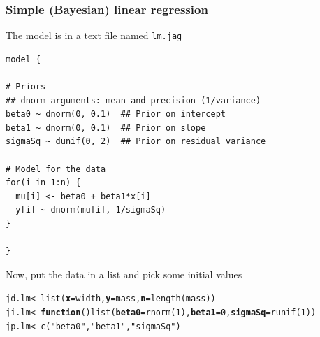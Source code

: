 \documentclass[color=usenames,dvipsnames]{beamer}\usepackage[]{graphicx}\usepackage[]{xcolor}
\makeatletter
\newcommand{\hlnum}[1]{\textcolor[rgb]{0.69,0.494,0}{#1}}%
\newcommand{\hlsng}[1]{\textcolor[rgb]{0.749,0.012,0.012}{#1}}%
\newcommand{\hldef}[1]{\textcolor[rgb]{0,0,0}{#1}}%
\newcommand{\hlkwa}[1]{\textcolor[rgb]{0,0,0}{\textbf{#1}}}%
\newcommand{\hlkwb}[1]{\textcolor[rgb]{0,0.341,0.682}{#1}}%
\newcommand{\hlkwc}[1]{\textcolor[rgb]{0,0,0}{\textbf{#1}}}%
\newcommand{\hlkwd}[1]{\textcolor[rgb]{0.004,0.004,0.506}{#1}}%
\newenvironment{kframe}{%
 \def\at@end@of@kframe{}%
 \ifinner\ifhmode%
  \def\at@end@of@kframe{\end{minipage}}%
  \begin{minipage}{\columnwidth}%
 \fi\fi%
 \def\FrameCommand##1{\hskip\@totalleftmargin \hskip-\fboxsep
 \colorbox{shadecolor}{##1}\hskip-\fboxsep
     \hskip-\linewidth \hskip-\@totalleftmargin \hskip\columnwidth}%
 \MakeFramed {\advance\hsize-\width
   \@totalleftmargin\z@ \linewidth\hsize
   \@setminipage}}%
 {\par\unskip\endMakeFramed%
 \at@end@of@kframe}
\newenvironment{knitrout}{}{} %
\makeatother
\begin{document}
\begin{frame}[fragile]
  \frametitle{Simple (Bayesian) linear regression}
  \small
  The model is in a text file named {\tt lm.jag} \\
\begin{knitrout}\scriptsize
{}\color{fgcolor}\begin{kframe}
\begin{verbatim}
model {

# Priors
## dnorm arguments: mean and precision (1/variance)
beta0 ~ dnorm(0, 0.1)  ## Prior on intercept  
beta1 ~ dnorm(0, 0.1)  ## Prior on slope
sigmaSq ~ dunif(0, 2)  ## Prior on residual variance

# Model for the data
for(i in 1:n) {
  mu[i] <- beta0 + beta1*x[i]
  y[i] ~ dnorm(mu[i], 1/sigmaSq)
}

}
\end{verbatim}
\end{kframe}
\end{knitrout}
\pause
\vfill
Now, put the data in a list and pick some initial values
\begin{knitrout}\footnotesize
{}\color{fgcolor}\begin{kframe}
\begin{alltt}
\hldef{jd.lm} \hlkwb{<-} \hlkwd{list}\hldef{(}\hlkwc{x}\hldef{=width,} \hlkwc{y}\hldef{=mass,} \hlkwc{n}\hldef{=}\hlkwd{length}\hldef{(mass))}
\hldef{ji.lm} \hlkwb{<-} \hlkwa{function}\hldef{()} \hlkwd{list}\hldef{(}\hlkwc{beta0}\hldef{=}\hlkwd{rnorm}\hldef{(}\hlnum{1}\hldef{),} \hlkwc{beta1}\hldef{=}\hlnum{0}\hldef{,} \hlkwc{sigmaSq}\hldef{=}\hlkwd{runif}\hldef{(}\hlnum{1}\hldef{))}
\hldef{jp.lm} \hlkwb{<-} \hlkwd{c}\hldef{(}\hlsng{"beta0"}\hldef{,} \hlsng{"beta1"}\hldef{,} \hlsng{"sigmaSq"}\hldef{)}
\end{alltt}
\end{kframe}
\end{knitrout}
\end{frame}
\end{document}
